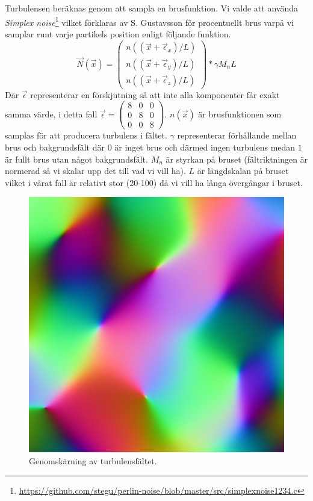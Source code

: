 \documentclass[a4paper]{article}
\begin{document}
\begin{multicols}{2}
    Turbulensen beräknas genom att sampla en brusfunktion. Vi valde att använda \textit{Simplex noise}\footnote{\url{https://github.com/stegu/perlin-noise/blob/master/src/simplexnoise1234.c}} vilket förklaras av S. Gustavsson\cite{gustavson2005simplex} för procentuellt brus varpå vi samplar runt varje partikels position enligt följande funktion.
    \begin{equation}
   \vec{N}(\vec{x}) =  
        \begin{pmatrix}
        n((\vec{x} + \vec{\epsilon}_x)/L)
        \\
        n((\vec{x} + \vec{\epsilon}_y)/L)
        \\ 
        n((\vec{x} + \vec{\epsilon}_z)/L)
        \end{pmatrix} * \gamma M_nL
    \end{equation}
    Där $\vec{\epsilon}$ representerar en förskjutning så att inte alla komponenter får exakt samma värde, i detta fall $\vec{\epsilon} = \begin{pmatrix}
8 & 0 & 0\\ 
0 & 8 & 0\\ 
0 & 0 & 8
\end{pmatrix}$. $n(\vec{x})$ är brusfunktionen som samplas för att producera turbulens i fältet. $\gamma$ representerar förhållande mellan brus och bakgrundsfält där $0$ är inget brus och därmed ingen turbulens medan $1$ är fullt brus utan något bakgrundsfält. $M_n$ är styrkan på bruset (fältriktningen är normerad så vi skalar upp det till vad vi vill ha). $L$ är längdskalan på bruset vilket i vårat fall är relativt stor (20-100) då vi vill ha långa övergångar i bruset.
\begin{figure}[H]
\center
\begin{minipage}[]{0.3\textwidth}
\includegraphics[width=\textwidth]{share/Noise_downscale.png}
\caption{Genomskärning av turbulensfältet.}
\end{minipage}
\end{figure}


\end{multicols}
\end{document}
